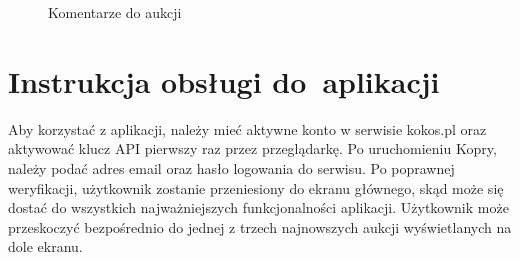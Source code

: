 \documentclass[a4paper,twoside,titlepage,openright]{book}
\begin{document}
\begin{figure}[t]
\begin{minipage}[t]{0.3\textwidth}
		\caption{Komentarze do aukcji}
		\label{fig:aukcjaKomentarze}
	\end{minipage}
\end{figure}


\newpage
\section{Instrukcja obsługi do~aplikacji}
Aby korzystać z aplikacji, należy mieć aktywne konto w serwisie kokos.pl oraz aktywować klucz API pierwszy raz przez przeglądarkę. Po uruchomieniu Kopry, należy podać adres email oraz hasło logowania do serwisu. Po poprawnej weryfikacji, użytkownik zostanie przeniesiony do ekranu głównego, skąd może się dostać do wszystkich najważniejszych funkcjonalności aplikacji. Użytkownik może przeskoczyć bezpośrednio do jednej z trzech najnowszych aukcji wyświetlanych na dole ekranu.
\end{document}
